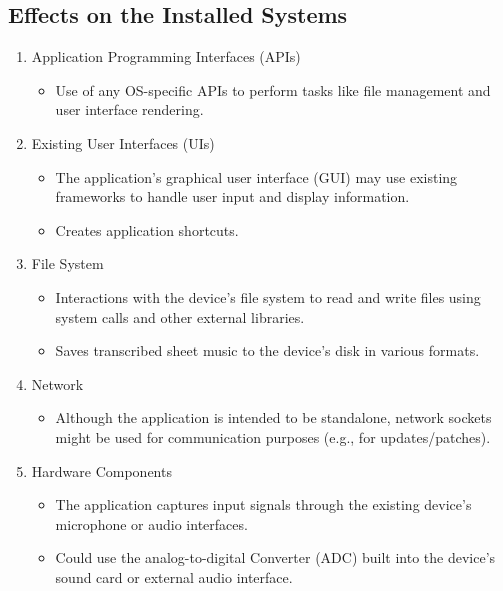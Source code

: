 \documentclass[12pt]{article}
\begin{document}
\subsection{Effects on the Installed Systems}
\begin{enumerate}
  \item Application Programming Interfaces (APIs)
  \begin{itemize}
      \item Use of any OS-specific APIs to perform tasks like file management and user interface rendering.
  \end{itemize}
  \item Existing User Interfaces (UIs)
  \begin{itemize}
      \item The application’s graphical user interface (GUI) may use existing frameworks to handle user input and display information.
      \item Creates application shortcuts.
  \end{itemize}
  \item File System
  \begin{itemize}
      \item Interactions with the device’s file system to read and write files using system calls and other external libraries.
      \item Saves transcribed sheet music to the device’s disk in various formats.
  \end{itemize}
  \item Network
  \begin{itemize}
      \item Although the application is intended to be standalone, network sockets might be used for communication purposes (e.g., for updates/patches).
  \end{itemize}
  \item Hardware Components
  \begin{itemize}
      \item The application captures input signals through the existing device’s microphone or audio interfaces.
      \item Could use the analog-to-digital Converter (ADC) built into the device’s sound card or external audio interface.
  \end{itemize}
\end{enumerate}
\end{document}
